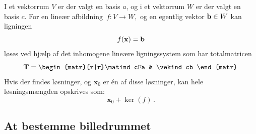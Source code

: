 \begin{method}[Løsning af vektorligningen \textit{f(x) = b}]\label{tn8.metodeVektorlign}
I et vektorrum $V$ er der valgt en basis $a$, og i et vektorrum $ W $ er der valgt en basis $c$. For en lineær afbildning $\,f:V\rightarrow W,$ og en egentlig vektor $\mathbf{b} \in W$ kan ligningen
$$f(\mathbf x)=\mathbf{b}$$
løses ved hjælp af det inhomogene lineære ligningssystem som har totalmatricen
$$\mT=
\begin{matr}{r|r}\matind cFa & \vekind cb \end{matr}\,$$
Hvis der findes løsninger, og $\mathbf x_0$ er én af disse løsninger, kan hele løsningsmængden opskrives som:
$$
\mathbf x_0+\ker(f)\,.$$
\end{method}

\subsection{At bestemme billedrummet}

